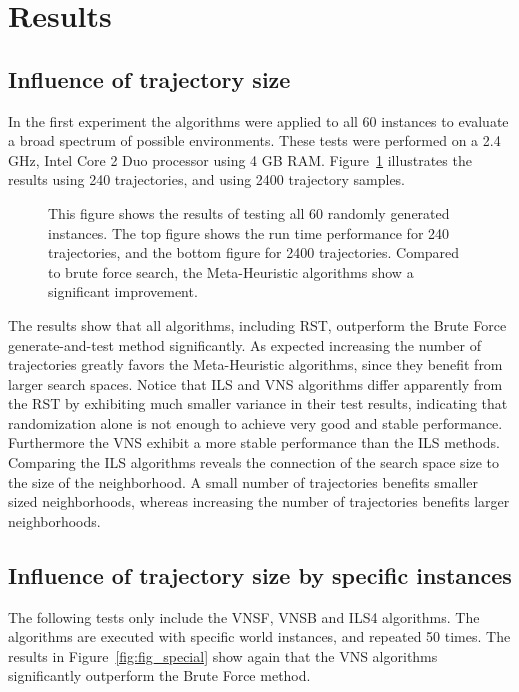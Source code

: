 \section{Results}\label{sec:testresults}
\subsection{Influence of trajectory size}
In the first experiment the algorithms were applied to all 60 instances to evaluate a broad spectrum of possible environments. These tests were performed on a 2.4 GHz, Intel Core 2 Duo processor using 4 GB RAM.  
Figure~\ref{fig:fig_allworlds} illustrates the results using 240 trajectories, and using 2400 trajectory samples.
   \begin{figure}[thpb]
        \footnotesize
      \centering
      \def\svgwidth{\textwidth}
      
      \caption{This figure shows the results of testing all 60 randomly generated instances. The top figure shows the run time performance for 240 trajectories, and the bottom figure for 2400 trajectories. Compared to brute force search, the Meta-Heuristic algorithms show a significant improvement. }
      \label{fig:fig_allworlds}
   \end{figure}

 
The results show that all algorithms, including RST, outperform the Brute Force generate-and-test method significantly. 
As expected increasing the number of trajectories greatly favors the Meta-Heuristic algorithms, since they benefit from larger search spaces. 
Notice that ILS and VNS algorithms differ apparently from the RST by exhibiting much smaller variance in their test results, indicating that randomization alone is not enough to achieve very good and stable performance.
Furthermore the VNS exhibit a more stable performance than the ILS methods. 
Comparing the ILS algorithms reveals the connection of the search space size to the size of the neighborhood. 
A small number of trajectories benefits smaller sized neighborhoods, whereas increasing the number of trajectories benefits larger neighborhoods. 

\subsection{Influence of trajectory size by specific instances}
The following tests only include the VNSF, VNSB and ILS4 algorithms. 
The algorithms are executed with specific world instances, and repeated 50 times. 
The results in Figure~\ref{fig:fig_special} show again that the VNS algorithms significantly outperform the Brute Force method. 

